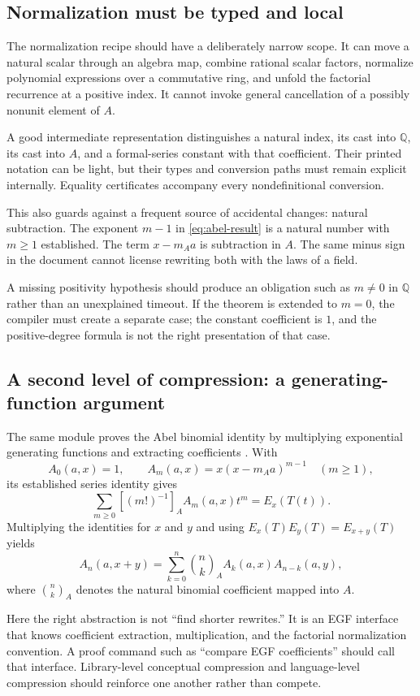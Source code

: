 \documentclass[11pt,letterpaper]{article}
\newcommand{\Q}{\mathbb Q}
\theoremstyle{remark}
\begin{document}
\subsection{Normalization must be typed and local}

The normalization recipe should have a deliberately narrow scope. It can move a natural scalar through an algebra map, combine rational scalar factors, normalize polynomial expressions over a commutative ring, and unfold the factorial recurrence at a positive index. It cannot invoke general cancellation of a possibly nonunit element of $A$.

A good intermediate representation distinguishes a natural index, its cast into $\Q$, its cast into $A$, and a formal-series constant with that coefficient. Their printed notation can be light, but their types and conversion paths must remain explicit internally. Equality certificates accompany every nondefinitional conversion.

This also guards against a frequent source of accidental changes: natural subtraction. The exponent $m-1$ in \eqref{eq:abel-result} is a natural number with $m\geq1$ established. The term $x-m_Aa$ is subtraction in $A$. The same minus sign in the document cannot license rewriting both with the laws of a field.

A missing positivity hypothesis should produce an obligation such as $m\neq0$ in $\Q$ rather than an unexplained timeout. If the theorem is extended to $m=0$, the compiler must create a separate case; the constant coefficient is $1$, and the positive-degree formula is not the right presentation of that case.

\subsection{A second level of compression: a generating-function argument}

The same module proves the Abel binomial identity by multiplying exponential generating functions and extracting coefficients \cite{proveit-abel}. With
\[
 A_0(a,x)=1,\qquad A_m(a,x)=x(x-m_Aa)^{m-1}\quad(m\geq1),
\]
its established series identity gives
\[
 \sum_{m\geq0}[(m!)^{-1}]_A A_m(a,x)t^m=E_x(T(t)).
\]
Multiplying the identities for $x$ and $y$ and using $E_x(T)E_y(T)=E_{x+y}(T)$ yields
\[
 A_n(a,x+y)=\sum_{k=0}^{n}\binom nk_A A_k(a,x)A_{n-k}(a,y),
\]
where $\binom nk_A$ denotes the natural binomial coefficient mapped into $A$.

Here the right abstraction is not ``find shorter rewrites.'' It is an EGF interface that knows coefficient extraction, multiplication, and the factorial normalization convention. A proof command such as ``compare EGF coefficients'' should call that interface. Library-level conceptual compression and language-level compression should reinforce one another rather than compete.
\end{document}
